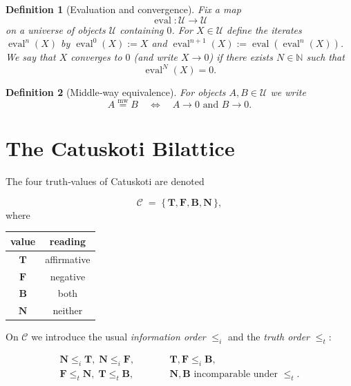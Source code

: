 \documentclass[12pt,a4paper]{article}
\newcommand{\dfix}{\mathfrak{0}}          %
\newcommand{\mw}{\mathrel{\overset{\mathrm{mw}}{=}}} %
\newtheorem{definition}{Definition}[section]
\begin{document}
\begin{definition}[Evaluation and convergence]
Fix a map
\[
  \operatorname{eval}:\mathcal{U}\to\mathcal{U}
\]
on a universe of objects $\mathcal{U}$ containing $\dfix$.
For $X\in\mathcal{U}$ define the iterates $\operatorname{eval}^n(X)$ by
$\operatorname{eval}^0(X):=X$ and $\operatorname{eval}^{n+1}(X):=\operatorname{eval}(\operatorname{eval}^n(X))$.
We say that $X$ \emph{converges} to $\dfix$ (and write $X\to\dfix$) if there exists $N\in\mathbb{N}$ such that
\[
  \operatorname{eval}^N(X)=\dfix.
\]
\end{definition}

\begin{definition}[Middle‑way equivalence]
For objects $A,B\in\mathcal{U}$ we write
\[
A\mw B
\quad\Longleftrightarrow\quad
A\to\dfix\text{ and }B\to\dfix.
\]
\end{definition}

\section{The Catuskoti Bilattice}

The four truth‑values of Catuskoti are denoted

$$
\mathcal{C}\;=\;\{\,\mathbf{T},\mathbf{F},
                 \mathbf{B},\mathbf{N}\,\},
$$
where

\begin{center}
\begin{tabular}{c|c}
value & reading \\ \hline
$\mathbf{T}$ & affirmative \\
$\mathbf{F}$ & negative \\
$\mathbf{B}$ & both \\
$\mathbf{N}$ & neither \\
\end{tabular}
\end{center}

On $\mathcal{C}$ we introduce the usual \emph{information order}
$\le_i$ and the \emph{truth order} $\le_t$:

$$
\begin{array}{ccl}
\mathbf{N}\le_i\mathbf{T},\;\mathbf{N}\le_i\mathbf{F},
&\qquad&
\mathbf{T},\mathbf{F}\le_i\mathbf{B},\\[2mm]
\mathbf{F}\le_t\mathbf{N},\;
\mathbf{T}\le_t\mathbf{B},
&\qquad&
\mathbf{N},\mathbf{B}\text{ incomparable under }\le_t .
\end{array}
$$
\end{document}
